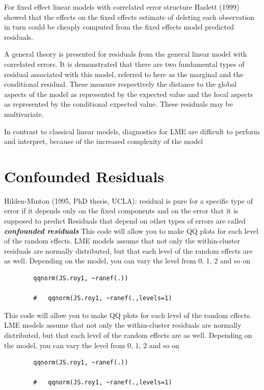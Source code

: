 \documentclass[12pt, a4paper]{report}
\theoremstyle{plain}
\theoremstyle{definition}
\theoremstyle{remark}
\begin{document}
	For fixed effect linear models with correlated error structure
	Haslett (1999) showed that the effects on the fixed effects
	estimate of deleting each observation in turn could be cheaply
	computed from the fixed effects model predicted residuals.
	
	
	A general theory is presented for residuals from the general
	linear model with correlated errors. It is demonstrated that there
	are two fundamental types of residual associated with this model,
	referred to here as the marginal and the conditional residual.
	These measure respectively the distance to the global aspects of
	the model as represented by the expected value and the local
	aspects as represented by the conditional expected value. These
	residuals may be multivariate.
	
	In contrast to classical linear models, diagnostics for LME are
	difficult to perform and interpret, because of the increased
	complexity of the model
	
	\section{Confounded Residuals}
	Hilden-Minton (1995, PhD thesis, UCLA): residual is pure for a specific type of error if it depends only on the fixed components and
	on the error that it is supposed to predict	Residuals that depend on other types of errors are called \textit{\textbf{confounded
			residuals}}
	This code will allow you to make QQ plots for each level of the random effects.  LME models assume that not only the within-cluster residuals are normally distributed, but that each level of the random effects are as well. Depending on the model, you can vary the level from 0, 1, 2 and so on
	\begin{framed}
		\begin{verbatim}
		qqnorm(JS.roy1, ~ranef(.))
		
		# 	qqnorm(JS.roy1, ~ranef(.,levels=1)
		\end{verbatim}
	\end{framed}
	This code will allow you to make QQ plots for each level of the random effects.  LME models assume that not only the within-cluster residuals are normally distributed, but that each level of the random effects are as well. Depending on the model, you can vary the level from 0, 1, 2 and so on
	\begin{framed}
		\begin{verbatim}
		qqnorm(JS.roy1, ~ranef(.))
		
		# 	qqnorm(JS.roy1, ~ranef(.,levels=1)
		\end{verbatim}
	\end{framed}
\end{document}
